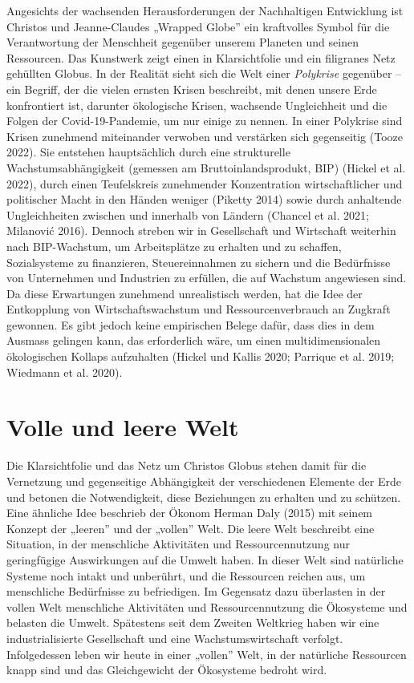 \documentclass[
  nswissgerman,
  a4paper,
  DIV=11,
  numbers=noendperiod,
  oneside,
  openany]{scrreprt}
\begin{document}
Angesichts der wachsenden Herausforderungen der Nachhaltigen Entwicklung
ist Christos und Jeanne-Claudes „Wrapped Globe'' ein kraftvolles Symbol
für die Verantwortung der Menschheit gegenüber unserem Planeten und
seinen Ressourcen. Das Kunstwerk zeigt einen in Klarsichtfolie und ein
filigranes Netz gehüllten Globus. In der Realität sieht sich die Welt
einer \emph{Polykrise} gegenüber -- ein Begriff, der die vielen ernsten
Krisen beschreibt, mit denen unsere Erde konfrontiert ist, darunter
ökologische Krisen, wachsende Ungleichheit und die Folgen der
Covid-19-Pandemie, um nur einige zu nennen. In einer Polykrise sind
Krisen zunehmend miteinander verwoben und verstärken sich gegenseitig
(Tooze 2022). Sie entstehen hauptsächlich durch eine strukturelle
Wachstumsabhängigkeit (gemessen am Bruttoinlandsprodukt, BIP) (Hickel et
al. 2022), durch einen Teufelskreis zunehmender Konzentration
wirtschaftlicher und politischer Macht in den Händen weniger (Piketty
2014) sowie durch anhaltende Ungleichheiten zwischen und innerhalb von
Ländern (Chancel et al. 2021; Milanović 2016). Dennoch streben wir in
Gesellschaft und Wirtschaft weiterhin nach BIP-Wachstum, um
Arbeitsplätze zu erhalten und zu schaffen, Sozialsysteme zu finanzieren,
Steuereinnahmen zu sichern und die Bedürfnisse von Unternehmen und
Industrien zu erfüllen, die auf Wachstum angewiesen sind. Da diese
Erwartungen zunehmend unrealistisch werden, hat die Idee der Entkopplung
von Wirtschaftswachstum und Ressourcenverbrauch an Zugkraft gewonnen. Es
gibt jedoch keine empirischen Belege dafür, dass dies in dem Ausmass
gelingen kann, das erforderlich wäre, um einen multidimensionalen
ökologischen Kollaps aufzuhalten (Hickel und Kallis 2020; Parrique et
al. 2019; Wiedmann et al. 2020).

\section*{Volle und leere Welt}\label{volle-und-leere-welt}


Die Klarsichtfolie und das Netz um Christos Globus stehen damit für die
Vernetzung und gegenseitige Abhängigkeit der verschiedenen Elemente der
Erde und betonen die Notwendigkeit, diese Beziehungen zu erhalten und zu
schützen. Eine ähnliche Idee beschrieb der Ökonom Herman Daly (2015) mit
seinem Konzept der „leeren'' und der „vollen'' Welt. Die leere Welt
beschreibt eine Situation, in der menschliche Aktivitäten und
Ressourcennutzung nur geringfügige Auswirkungen auf die Umwelt haben. In
dieser Welt sind natürliche Systeme noch intakt und unberührt, und die
Ressourcen reichen aus, um menschliche Bedürfnisse zu befriedigen. Im
Gegensatz dazu überlasten in der vollen Welt menschliche Aktivitäten und
Ressourcennutzung die Ökosysteme und belasten die Umwelt. Spätestens
seit dem Zweiten Weltkrieg haben wir eine industrialisierte Gesellschaft
und eine Wachstumswirtschaft verfolgt. Infolgedessen leben wir heute in
einer „vollen'' Welt, in der natürliche Ressourcen knapp sind und das
Gleichgewicht der Ökosysteme bedroht wird.
\end{document}
